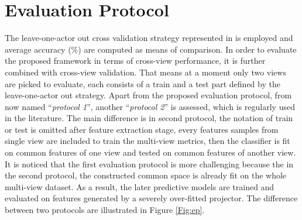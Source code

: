 
\section{Evaluation Protocol} \label{sec:protocol}
    The leave-one-actor out cross validation strategy represented in \cite{Stone1974} is employed and average accuracy (\%) are computed as means of comparison.
    In order to evaluate the proposed framework in terms of cross-view performance, it is further combined with cross-view validation.
    That means at a moment only two views are picked to evaluate, each consists of a train and a test part defined by the leave-one-actor out strategy.
    Apart from the proposed evaluation protocol, from now named ``\emph{protocol 1}'', another ``\emph{protocol 2}'' is assessed, which is regularly used in the literature.
    The main difference is in second protocol, the notation of train or test is omitted after feature extraction stage, every features samples from single view are included to train the multi-view metrics, then the classifier is fit on common features of one view and tested on common features of another view.
    It is noticed that the first evaluation protocol is more challenging because the in the second protocol, the constructed common space is already fit on the whole multi-view dataset. As a result, the later predictive models are trained and evaluated on features generated by a severely over-fitted projector. %
    The difference between two protocols are illustrated in Figure \ref{Fig:ep}. 

